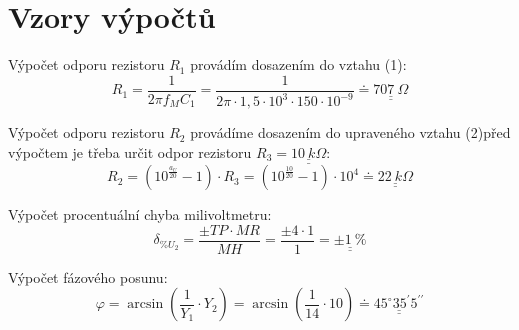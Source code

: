 \section*{Vzory výpočtů}
  
  Výpočet odporu rezistoru $R_1$ provádím dosazením do vztahu (1):
  \begin{equation}
    R_1 = \dfrac{1}{2\pi f_M C_1} = \dfrac{1}{2\pi \cdot 1,5 \cdot 10^3 \cdot 150 \cdot 10^{-9}} \doteq \underline{\underline{707~\Omega}}
    \nonumber
  \end{equation}
  
  Výpočet odporu rezistoru $R_2$ provádíme dosazením do upraveného vztahu (2)před výpočtem je třeba určit odpor rezistoru $R_3=\underline{\underline{10~k\Omega}}$:
  \begin{equation}
    R_2 = (10^{\frac{a_U}{20}}-1)\cdot R_3 = (10^{\frac{10}{20}}-1)\cdot 10^4 \doteq \underline{\underline{22~k\Omega}}
    \nonumber
  \end{equation}   
  
  Výpočet procentuální chyba milivoltmetru:
  \begin{equation}
    \delta _{\%U_2} = \dfrac{\pm TP \cdot MR}{MH} = \dfrac{\pm 4 \cdot 1}{1} = \underline{\underline{\pm 1~\%}}
    \nonumber
  \end{equation} 
    
  Výpočet fázového posunu:
  \begin{equation}
    \varphi = \arcsin(\dfrac{1}{Y_1} \cdot Y_2) = \arcsin(\dfrac{1}{14} \cdot 10) \doteq \underline{\underline{45^\circ 35^\prime 5 ^{\prime \prime}}}
  	\nonumber
  \end{equation}
 